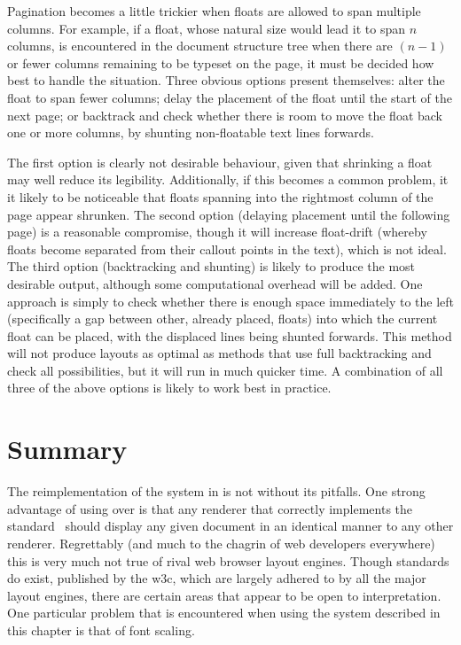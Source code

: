 \newpage %
Pagination becomes a little trickier when floats are allowed to span multiple columns. For example, if a float, whose natural size would lead it to span $n$ columns, is encountered in the document structure tree when there are $(n-1)$ or fewer columns remaining to be typeset on the page, it must be decided how best to handle the situation. Three obvious options present themselves: alter the float to span fewer columns; delay the placement of the float until the start of the next page; or backtrack and check whether there is room to move the float back one or more columns, by shunting non-floatable text lines forwards.

The first option is clearly not desirable behaviour, given that shrinking a float may well reduce its legibility. Additionally, if this becomes a common problem, it it likely to be noticeable that floats spanning into the rightmost column of the page appear shrunken. The second option (delaying placement until the following page) is a reasonable compromise, though it will increase float-drift (whereby floats become separated from their callout points in the text), which is not ideal. The third option (backtracking and shunting) is likely to produce the most desirable output, although some computational overhead will be added. One approach is simply to check whether there is enough space immediately to the left (specifically a gap between other, already placed, floats) into which the current float can be placed, with the displaced lines being shunted forwards. This method will not produce layouts as optimal as methods that use full backtracking and check all possibilities, but it will run in much quicker time. A combination of all three of the above options is likely to work best in practice.



\section{Summary}

The reimplementation of the system in \html{} is not without its pitfalls. One strong advantage of using \pdf{} over \html{} is that any \pdf{} renderer that correctly implements the standard~\cite{Adobe2001} should display any given document in an identical manner to any other renderer. Regrettably (and much to the chagrin of web developers everywhere) this is very much not true of rival web browser layout engines. Though standards do exist, published by the \gls{w3c}, which are largely adhered to by all the major layout engines, there are certain areas that appear to be open to interpretation. One particular problem that is encountered when using the system described in this chapter is that of font scaling. 

